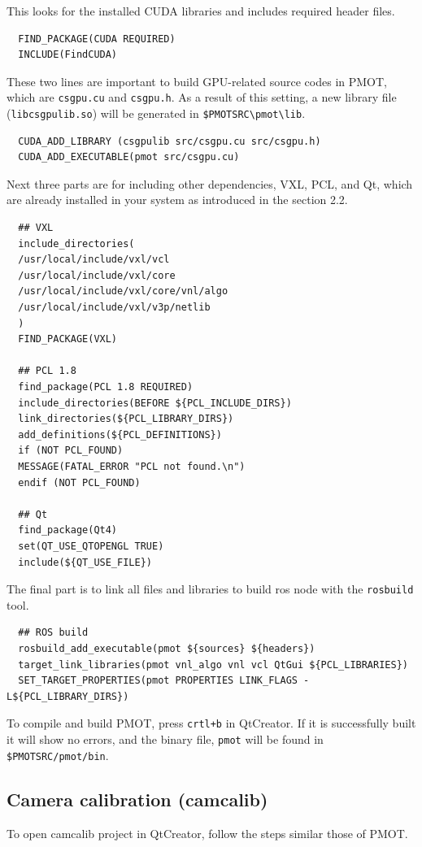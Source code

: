 \documentclass[a4paper,twoside, openright,12pt]{report}
\begin{document}
This looks for the installed CUDA libraries and includes required header files.
\begin{verbatim}
  FIND_PACKAGE(CUDA REQUIRED)
  INCLUDE(FindCUDA)
\end{verbatim}

These two lines are important to build GPU-related source codes in PMOT, which are \verb|csgpu.cu| and \verb|csgpu.h|. As a result of this setting, a new library file (\verb|libcsgpulib.so|) will be generated in \verb|$PMOTSRC\pmot\lib|.
\begin{verbatim}
  CUDA_ADD_LIBRARY (csgpulib src/csgpu.cu src/csgpu.h)
  CUDA_ADD_EXECUTABLE(pmot src/csgpu.cu)
\end{verbatim}

Next three parts are for including other dependencies, VXL, PCL, and Qt, which are already installed in your system as introduced in the section 2.2.
\begin{verbatim}
  ## VXL
  include_directories(
  /usr/local/include/vxl/vcl
  /usr/local/include/vxl/core
  /usr/local/include/vxl/core/vnl/algo
  /usr/local/include/vxl/v3p/netlib
  )
  FIND_PACKAGE(VXL)

  ## PCL 1.8
  find_package(PCL 1.8 REQUIRED)
  include_directories(BEFORE ${PCL_INCLUDE_DIRS})
  link_directories(${PCL_LIBRARY_DIRS})
  add_definitions(${PCL_DEFINITIONS})
  if (NOT PCL_FOUND)
  MESSAGE(FATAL_ERROR "PCL not found.\n")
  endif (NOT PCL_FOUND)

  ## Qt
  find_package(Qt4)
  set(QT_USE_QTOPENGL TRUE)
  include(${QT_USE_FILE})
\end{verbatim}

The final part is to link all files and libraries to build ros node with the \verb|rosbuild| tool. 
\begin{verbatim}
  ## ROS build
  rosbuild_add_executable(pmot ${sources} ${headers})
  target_link_libraries(pmot vnl_algo vnl vcl QtGui ${PCL_LIBRARIES})
  SET_TARGET_PROPERTIES(pmot PROPERTIES LINK_FLAGS -L${PCL_LIBRARY_DIRS})
\end{verbatim}

To compile and build PMOT, press \verb|crtl+b| in QtCreator. If it is successfully built it will show no errors, and the binary file, \verb|pmot| will be found in \verb|$PMOTSRC/pmot/bin|. 
\subsection{Camera calibration (camcalib)}
To open camcalib project in QtCreator, follow the steps similar those of PMOT. 
\end{document}
